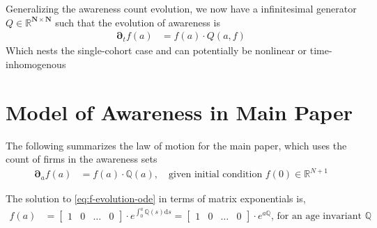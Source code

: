 \documentclass[12pt]{article}
\newcommand{\R}{\ensuremath{\mathbb{R}}}
\newcommand{\Q}[0]{\ensuremath{\mathbb{Q}}}
\newcommand{\D}[1][]{\ensuremath{\boldsymbol{\partial}_{#1}}}
\newcommand{\diff}{\ensuremath{\mathrm{d}}}
\begin{document}
Generalizing the awareness count evolution, we now have a infinitesimal generator $Q \in \R^{\mathbf{N} \times\mathbf{N}}$ such that the evolution of awareness is
\begin{align}
\D[t]f(a) &= f(a) \cdot Q(a, f)
\end{align}
Which nests the single-cohort case and can potentially be nonlinear or time-inhomogenous


\section{Model of Awareness in Main Paper}
The following summarizes the law of motion for the main paper, which uses the count of firms in the awareness sets
\begin{align}
	\D[a]f(a) &= f(a) \cdot \Q(a),\quad \text{given initial condition } f(0)\in\R^{N+1}\label{eq:f-evolution-ode}
	\end{align}
	
	\noindent The solution to \cref{eq:f-evolution-ode} in terms of matrix exponentials is, %
	\begin{align}
	f(a) &= \begin{bmatrix}1 & 0 & \ldots & 0\end{bmatrix}\cdot e^{\int_{0}^{a} \Q(s)\diff s} %
	= \begin{bmatrix}1 & 0 & \ldots & 0\end{bmatrix}\cdot e^{a\Q},\, \text{for an age invariant $\Q$}\label{eq:f-constant-Q-evolution}
\end{align}
\end{document}
